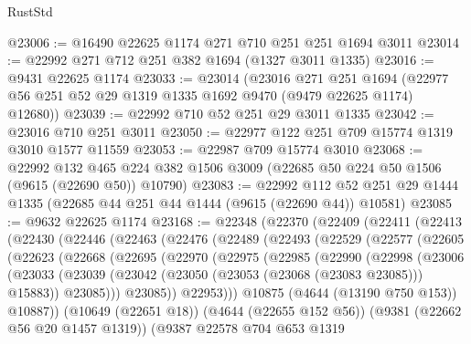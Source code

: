\begin{lexlean}{RustStd}
\begin{coremodule}
@23006 := @16490 @22625 @1174 @271 @710 @251 @251 @1694 @3011
@23014 := @22992 @271 @712 @251 @382 @1694 (@1327 @3011 @1335)
@23016 := @9431 @22625 @1174
@23033 := @23014
    (@23016
      @271
      @251
      @1694
      (@22977 @56 @251 @52 @29 @1319 @1335 @1692 @9470 (@9479 @22625 @1174) @12680))
@23039 := @22992 @710 @52 @251 @29 @3011 @1335
@23042 := @23016 @710 @251 @3011
@23050 := @22977 @122 @251 @709 @15774 @1319 @3010 @1577 @11559
@23053 := @22987 @709 @15774 @3010
@23068 := @22992
    @132
    @465
    @224
    @382
    @1506
    @3009
    (@22685 @50 @224 @50 @1506 (@9615 (@22690 @50)) @10790)
@23083 := @22992
    @112
    @52
    @251
    @29
    @1444
    @1335
    (@22685 @44 @251 @44 @1444 (@9615 (@22690 @44)) @10581)
@23085 := @9632 @22625 @1174
@23168 := @22348
    (@22370
      (@22409
        (@22411
          (@22413
            (@22430
              (@22446
                (@22463
                  (@22476
                    (@22489
                      (@22493
                        (@22529
                          (@22577
                            (@22605
                              (@22623
                                (@22668
                                  (@22695
                                    (@22970
                                      (@22975
                                        (@22985
                                          (@22990
                                            (@22998
                                              (@23006
                                                (@23033
                                                  (@23039
                                                    (@23042
                                                      (@23050
                                                        (@23053 (@23068 (@23083 @23085)))
                                                        @15883))
                                                    @23085)))
                                              @23085))
                                          @22953)))
                                    @10875
                                    (@4644 (@13190 @750 @153))
                                    @10887))
                                (@10649 (@22651 @18))
                                (@4644 (@22655 @152 @56))
                                (@9381 (@22662 @56 @20 @1457 @1319))
                                (@9387
                                  @22578
                                  @704
                                  @653
                                  @1319

\end{coremodule}
\end{lexlean}
